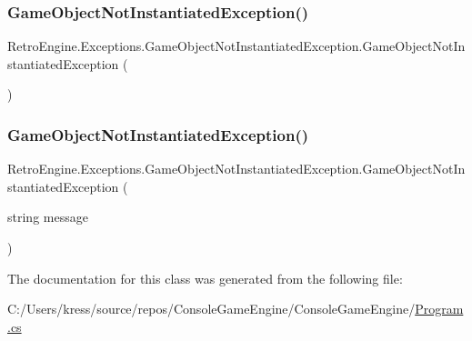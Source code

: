 \subsubsection{\texorpdfstring{GameObjectNotInstantiatedException()}{GameObjectNotInstantiatedException()}\hspace{0.1cm}{\footnotesize\ttfamily [1/2]}}
{\footnotesize\ttfamily Retro\+Engine.\+Exceptions.\+Game\+Object\+Not\+Instantiated\+Exception.\+Game\+Object\+Not\+Instantiated\+Exception (\begin{DoxyParamCaption}{ }\end{DoxyParamCaption})}

\mbox{\label{class_retro_engine_1_1_exceptions_1_1_game_object_not_instantiated_exception_a79d460b48115cfdadf41adcf7beb9592}} 
\subsubsection{\texorpdfstring{GameObjectNotInstantiatedException()}{GameObjectNotInstantiatedException()}\hspace{0.1cm}{\footnotesize\ttfamily [2/2]}}
{\footnotesize\ttfamily Retro\+Engine.\+Exceptions.\+Game\+Object\+Not\+Instantiated\+Exception.\+Game\+Object\+Not\+Instantiated\+Exception (\begin{DoxyParamCaption}\item[{string}]{message }\end{DoxyParamCaption})}



The documentation for this class was generated from the following file\+:\begin{DoxyCompactItemize}
\item 
C\+:/\+Users/kress/source/repos/\+Console\+Game\+Engine/\+Console\+Game\+Engine/\mbox{\hyperlink{_program_8cs}{Program.\+cs}}\end{DoxyCompactItemize}
